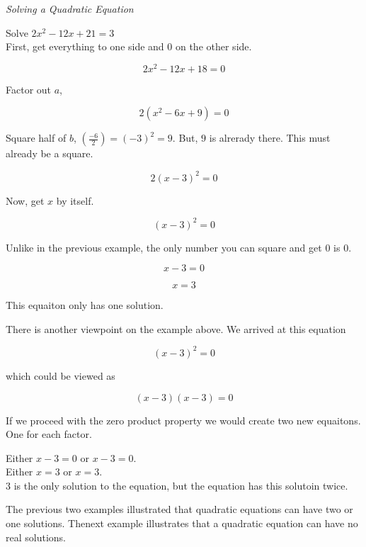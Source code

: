 \documentclass{ximera}
\begin{document}
\begin{example} \textit{Solving a Quadratic Equation}

Solve $2 x^2 - 12x + 21 = 3$ \\


First, get everything to one side and $0$ on the other side.



\[  2 x^2 - 12x + 18 = 0  \]

Factor out $a$,

\[  2 (x^2 - 6x + 9) = 0  \]


Square half of $b$, $\left(\frac{-6}{2}\right) = (-3)^2 = 9$.  But, $9$ is alrerady there.  This must already be a square.



\[  2 (x - 3)^2 = 0  \]


Now, get $x$ by itself.

\[  (x - 3)^2 = 0  \]


Unlike  in the previous example, the only number you can square and get $0$ is $0$.

\[  x - 3 = 0  \]

\[  x = 3  \]


This equaiton only has one solution.



\end{example}




There is another viewpoint on the example above.  We arrived at this equation

\[  (x - 3)^2 = 0  \]

which could be viewed as 

\[  (x - 3) (x - 3) = 0  \]


If we proceed with the zero product property we would create two new equaitons.  One for each factor.

Either $x - 3 = 0$   or $x - 3 = 0$. \\

Either $x = 3$ or $x = 3$.  \\

$3$ is the only solution to the equation, but the equation has this solutoin twice.


The previous two examples illustrated that quadratic equations can have two or one solutions.  Thenext example illustrates that a quadratic equation can have no real solutions.
\end{document}
